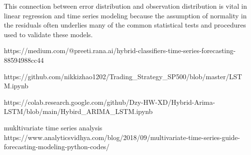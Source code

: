 This connection between error distribution and observation distribution is vital in linear regression and time series modeling because the assumption of normality in the residuals often underlies many of the common statistical tests and procedures used to validate these models.



https://medium.com/@preeti.rana.ai/hybrid-classifiers-time-series-forecasting-88594988cc44


https://github.com/nikkizhao1202/Trading_Strategy_SP500/blob/master/LSTM.ipynb


https://colab.research.google.com/github/Dzy-HW-XD/Hybrid-Arima-LSTM/blob/main/Hybird_ARIMA_LSTM.ipynb

mukltivariate time series analysis 
https://www.analyticsvidhya.com/blog/2018/09/multivariate-time-series-guide-forecasting-modeling-python-codes/